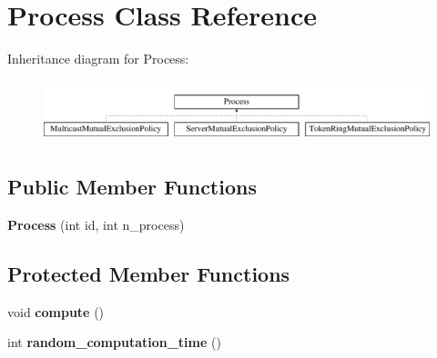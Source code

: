 \hypertarget{classdistributed__system_1_1Process}{}\section{Process Class Reference}
\label{classdistributed__system_1_1Process}
Inheritance diagram for Process\+:\begin{figure}[H]
\begin{center}
\leavevmode
\includegraphics[height=1.812298cm]{classdistributed__system_1_1Process}
\end{center}
\end{figure}
\subsection*{Public Member Functions}
\begin{DoxyCompactItemize}
\item 
{\bfseries Process} (int id, int n\+\_\+process)\hypertarget{classdistributed__system_1_1Process_a38d5653c5327038426dd69393130c775}{}\label{classdistributed__system_1_1Process_a38d5653c5327038426dd69393130c775}

\end{DoxyCompactItemize}
\subsection*{Protected Member Functions}
\begin{DoxyCompactItemize}
\item 
void {\bfseries compute} ()\hypertarget{classdistributed__system_1_1Process_a4993c97a669fa259c6574a18d547c117}{}\label{classdistributed__system_1_1Process_a4993c97a669fa259c6574a18d547c117}

\item 
int {\bfseries random\+\_\+computation\+\_\+time} ()\hypertarget{classdistributed__system_1_1Process_ab9067ec75c01e0143a81b0c4d7fe5d6b}{}\label{classdistributed__system_1_1Process_ab9067ec75c01e0143a81b0c4d7fe5d6b}

\end{DoxyCompactItemize}
